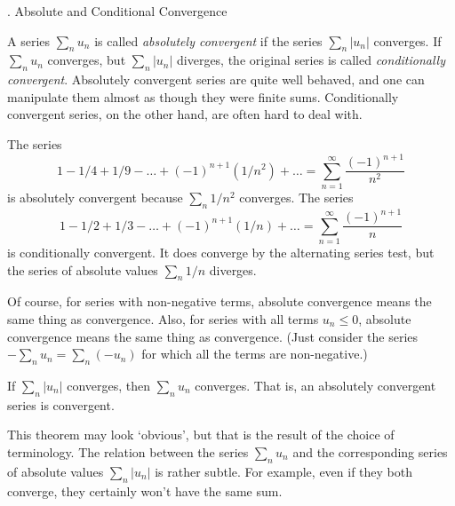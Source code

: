 \bigskip

\bigskip
{}
\head \sn.  Absolute and Conditional Convergence \endhead

A series $\sum_n u_n$ is called {\it absolutely convergent\/}
%
%
if the series $\sum_n |u_n|$ converges.  If $\sum_n u_n$ converges,
but $\sum_n |u_n|$ diverges, the original series is called
{\it conditionally convergent}.  Absolutely convergent series
are quite well behaved, and one can manipulate them almost
as though they were finite sums.   Conditionally convergent
series, on the other hand, are often hard to deal with.

  The series 
$$
 1 - 1/4 + 1/9 - \dots + (-1)^{n+1}(1/n^2) + \dots = \sum_{n=1}^\infty
\frac{(-1)^{n+1}}{n^2}
$$
is absolutely convergent because $\sum_n 1/n^2$ converges.
The series
 $$1 - 1/2 + 1/3 - \dots + (-1)^{n+1}(1/n) + \dots = \sum_{n=1}^\infty
\frac{(-1)^{n+1}}n
 $$
is conditionally convergent.  It does converge by the alternating
series test, but the series of absolute values $\sum_n 1/n$ diverges.
\endexample

Of course, for series with non-negative terms, absolute convergence
means the same  thing as convergence.  Also, for series with all terms
$u_n \le 0$, absolute convergence means the same thing as convergence.
(Just consider the series $-\sum_n u_n = \sum_n (-u_n)$ for which all
the terms are non-negative.)

\nextthm
{}  If $\sum_n |u_n|$ converges,
then $\sum_n u_n$ converges.  That is, an absolutely convergent
series is convergent.
\endproclaim

This theorem may look `obvious', but that is the result
of the choice of terminology.  The relation between the
series $\sum_n u_n$ and the corresponding series of absolute
values  $\sum_n |u_n|$ is rather subtle.   For example, even
if they both converge, they certainly won't have the same
sum.  

